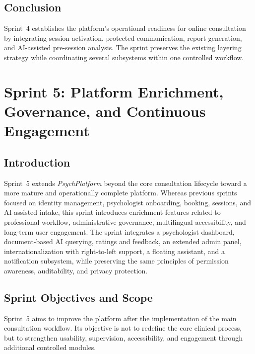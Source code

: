 \documentclass[a4paper,12pt]{report}
\begin{document}
\section{Conclusion}
Sprint~4 establishes the platform's operational readiness for online consultation by integrating session activation, protected communication, report generation, and AI-assisted pre-session analysis. The sprint preserves the existing layering strategy while coordinating several subsystems within one controlled workflow.

\chapter{Sprint 5: Platform Enrichment, Governance, and Continuous Engagement}
\label{chap:sprint5-enrichment}

\section*{Introduction}
{}

Sprint~5 extends \emph{PsychPlatform} beyond the core consultation lifecycle toward a more
mature and operationally complete platform. Whereas previous sprints focused on identity
management, psychologist onboarding, booking, sessions, and AI-assisted intake, this sprint
introduces enrichment features related to professional workflow, administrative governance,
multilingual accessibility, and long-term user engagement. The sprint integrates a psychologist
dashboard, document-based AI querying, ratings and feedback, an extended admin panel,
internationalization with right-to-left support, a floating assistant, and a notification
subsystem, while preserving the same principles of permission awareness, auditability, and
privacy protection.

\section{Sprint Objectives and Scope}
\label{sec:sprint5-objectives}

Sprint~5 aims to improve the platform after the implementation of the main consultation
workflow. Its objective is not to redefine the core clinical process, but to strengthen
usability, supervision, accessibility, and engagement through additional controlled modules.
\end{document}
